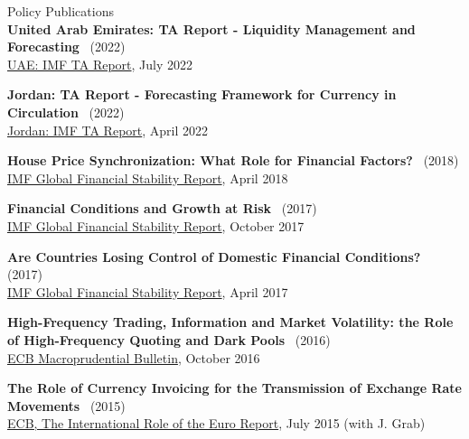 \documentclass[usegeometry, 10pt, a4paper]{cv} %
\newcommand{\activite}[1]{\textbf{#1}\ }
\begin{document}
\begin{rubriquetableau}[0.95\textwidth]{Policy Publications}\\

\activite{United Arab Emirates: TA Report - Liquidity Management and Forecasting} (2022) \\
\hspace{0.6cm}
\small{\href{https://www.imf.org/en/Publications/CR/Issues/2022/07/22/United-Arab-Emirates-Technical-Assistance-Report-Liquidity-Management-and-Forecasting-521194}{UAE: IMF TA Report}, July 2022}
\vspace{0.4cm} 

\activite{Jordan: TA Report - Forecasting Framework for Currency in Circulation} (2022) \\
\hspace{0.6cm}
\small{\href{https://www.imf.org/en/Publications/CR/Issues/2022/04/07/Jordan-Technical-Assistance-Report-Forecasting-Framework-for-Currency-in-Circulation-516259}{Jordan: IMF TA Report}, April 2022}
\vspace{0.4cm} 
  
\activite{House Price Synchronization: What Role for Financial Factors?} (2018) \\
\hspace{0.6cm}
\small{\href{https://www.elibrary.imf.org/view/IMF082/24893-9781484338292/24893-9781484338292/ch03}{IMF
    Global Financial Stability Report}, April 2018}
\vspace{0.4cm} 


\activite{Financial Conditions and Growth at Risk} (2017) \\
\hspace{0.6cm}
\small{\href{https://www.imf.org/en/Publications/GFSR/Issues/2017/09/27/global-financial-stability-report-october-2017}{IMF
    Global Financial Stability Report}, October
  2017}
\vspace{0.4cm} 


\activite{Are Countries Losing Control of Domestic Financial Conditions?} (2017) \\
\hspace{0.6cm}
\small{\href{https://www.imf.org/~/media/Files/Publications/GFSR/2017/April/ch3.ashx}{IMF
    Global Financial Stability Report}, April
  2017}
\vspace{0.4cm} 


\activite{High-Frequency Trading, Information and Market Volatility: the Role of High-Frequency
  Quoting and Dark Pools} (2016) \\
\hspace{0.6cm} \small{\href{https://ideas.repec.org/a/ecb/ecbmbu/201600023.html}{ECB Macroprudential Bulletin}, October 2016}
\vspace{0.4cm} 


\activite{The Role of Currency Invoicing for the Transmission of Exchange Rate Movements} (2015) \\
\hspace{0.6cm} \small{\href{https://www.ecb.europa.eu/pub/pdf/ire/euro-international-role-201507.en.pdf}{ECB, The International Role of the Euro Report}, July 2015 (with J. Grab)}
\end{rubriquetableau}
\end{document}
